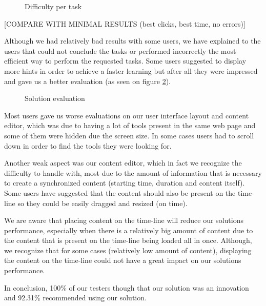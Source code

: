 \begin{figure}[!htb]
\centering
\begin{minipage}[b]{0.45\linewidth}
  \begin{center}
    
  \end{center}
  \caption{Errors per task}
  \label{fig:user_errors}
\end{minipage}
\begin{minipage}[b]{0.45\linewidth}
  \begin{center}
    
  \end{center}
  \caption{Difficulty per task}
  \label{fig:user_diffs}
\end{minipage}
\end{figure}

[COMPARE WITH MINIMAL RESULTS (best clicks, best time, no errors)]

Although we had relatively bad results with some users, we have explained to the users that could not conclude the tasks or performed incorrectly the most efficient way to perform the requested tasks. Some users suggested to display more hints in order to achieve a faster learning but after all they were impressed and gave us a better evaluation (as seen on figure \ref{fig:user_evals}).

\begin{figure}[!htb]
  \begin{center}
    
  \end{center}
  \caption{Solution evaluation}
  \label{fig:user_evals}
\end{figure}

Most users gave us worse evaluations on our user interface layout and content editor, which was due to having a lot of tools present in the same web page and some of them were hidden due the screen size. In some cases users had to scroll down in order to find the tools they were looking for. 

Another weak aspect was our content editor, which in fact we recognize the difficulty to handle with, most due to the amount of information that is necessary to create a synchronized content (starting time, duration and content itself). Some users have suggested that the content should also be present on the time-line so they could be easily dragged and resized (on time).

We are aware that placing content on the time-line will reduce our solutions performance, especially when there is a relatively big amount of content due to the content that is present on the time-line being loaded all in once. Although, we recognize that for some cases (relatively low amount of content), displaying the content on the time-line could not have a great impact on our solutions performance. 

In conclusion, 100\% of our testers though that our solution was an innovation and 92.31\% recommended using our solution.





